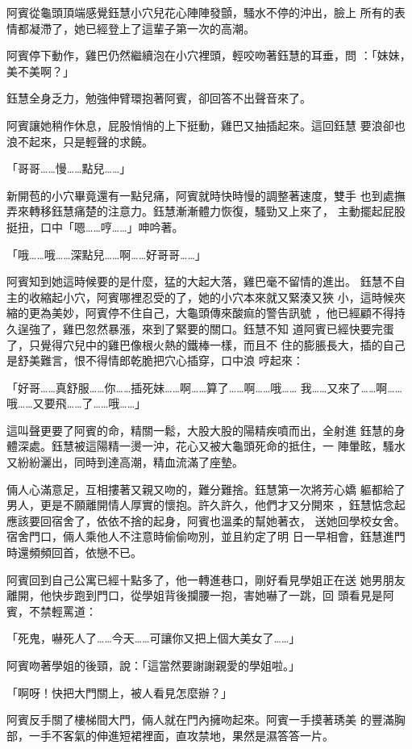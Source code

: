 阿賓從龜頭頂端感覺鈺慧小穴兒花心陣陣發顫，騷水不停的沖出，臉上
所有的表情都凝滯了，她已經登上了這輩子第一次的高潮。

阿賓停下動作，雞巴仍然繼續泡在小穴裡頭，輕咬吻著鈺慧的耳垂，問
：「妹妹，美不美啊？」

鈺慧全身乏力，勉強伸臂環抱著阿賓，卻回答不出聲音來了。

阿賓讓她稍作休息，屁股悄悄的上下挺動，雞巴又抽插起來。這回鈺慧
要浪卻也浪不起來，只是輕聲的求饒。

「哥哥……慢……點兒……」

新開苞的小穴畢竟還有一點兒痛，阿賓就時快時慢的調整著速度，雙手
也到處撫弄來轉移鈺慧痛楚的注意力。鈺慧漸漸體力恢復，騷勁又上來了，
主動擺起屁股挺扭，口中「嗯……哼……」呻吟著。

「哦……哦……深點兒……啊……好哥哥……」

阿賓知到她這時候要的是什麼，猛的大起大落，雞巴毫不留情的進出。
鈺慧不自主的收縮起小穴，阿賓哪裡忍受的了，她的小穴本來就又緊湊又狹
小，這時候夾縮的更為美妙，阿賓停不住自己，大龜頭傳來酸痲的警告訊號
，他已經顧不得持久逞強了，雞巴忽然暴漲，來到了緊要的關口。鈺慧不知
道阿賓已經快要完蛋了，只覺得穴兒中的雞巴像根火熱的鐵棒一樣，而且不
住的膨脹長大，插的自己是舒美難言，恨不得情郎乾脆把穴心插穿，口中浪
哼起來：

「好哥……真舒服……你……插死妹……啊……算了……啊……哦……
我……又來了……啊……哦……又要飛……了……哦……」

這叫聲更要了阿賓的命，精關一鬆，大股大股的陽精疾噴而出，全射進
鈺慧的身體深處。鈺慧被這陽精一燙一沖，花心又被大龜頭死命的抵住，一
陣暈眩，騷水又紛紛灑出，同時到達高潮，精血流滿了座墊。

倆人心滿意足，互相摟著又親又吻的，難分難捨。鈺慧第一次將芳心嬌
軀都給了男人，更是不願離開情人厚實的懷抱。許久許久，他們才又分開來
，鈺慧惦念起應該要回宿舍了，依依不捨的起身，阿賓也溫柔的幫她著衣，
送她回學校女舍。宿舍門口，倆人乘他人不注意時偷偷吻別，並且約定了明
日一早相會，鈺慧進門時還頻頻回首，依戀不已。

阿賓回到自己公寓已經十點多了，他一轉進巷口，剛好看見學姐正在送
她男朋友離開，他快步跑到門口，從學姐背後攔腰一抱，害她嚇了一跳，回
頭看見是阿賓，不禁輕罵道：

「死鬼，嚇死人了……今天……可讓你又把上個大美女了……」

阿賓吻著學姐的後頸，說：「這當然要謝謝親愛的學姐啦。」

「啊呀！快把大門關上，被人看見怎麼辦？」

阿賓反手關了樓梯間大門，倆人就在門內擁吻起來。阿賓一手摸著琇美
的豐滿胸部，一手不客氣的伸進短裙裡面，直攻禁地，果然是濕答答一片。

